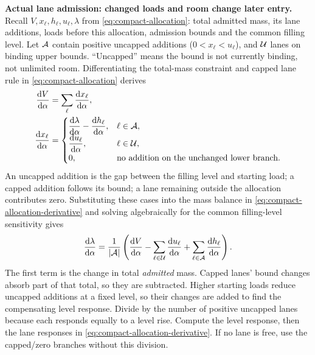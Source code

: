 \documentclass[10pt,a4paper]{article}
\begin{document}
\textbf{Actual lane admission: changed loads and room change later entry.}
Recall $V,x_\ell,h_\ell,u_\ell,\lambda$ from
\eqref{eq:compact-allocation}: total admitted mass, its lane additions,
loads before this allocation, admission bounds and the common filling
level. Let ${\cal A}$ contain positive uncapped additions
($0<x_\ell<u_\ell$), and ${\cal U}$ lanes on binding upper bounds.
``Uncapped'' means the bound is not currently binding, not unlimited room.
Differentiating the total-mass constraint and capped lane rule in \eqref{eq:compact-allocation} derives
\begin{equation}
 \begin{aligned}
 \frac{\mathrm dV}{\mathrm d\alpha}
 &=\sum_\ell\frac{\mathrm dx_\ell}{\mathrm d\alpha},\\
 \frac{\mathrm dx_\ell}{\mathrm d\alpha}
 &=\begin{cases}
 \displaystyle\frac{\mathrm d\lambda}{\mathrm d\alpha}
             -\frac{\mathrm dh_\ell}{\mathrm d\alpha},&\ell\in{\cal A},\\
 \displaystyle\frac{\mathrm du_\ell}{\mathrm d\alpha},&\ell\in{\cal U},\\
 0,&\text{no addition on the unchanged lower branch}.
 \end{cases}
 \end{aligned}
 \label{eq:compact-allocation-derivative}
\end{equation}
An uncapped addition is the gap between the filling level and starting
load; a capped addition follows its bound; a lane remaining outside the
allocation contributes zero. Substituting these cases into the mass
balance in \eqref{eq:compact-allocation-derivative} and solving algebraically for the common filling-level sensitivity gives
\begin{equation}
 \frac{\mathrm d\lambda}{\mathrm d\alpha}
 =\frac1{|{\cal A}|}\left(
 \frac{\mathrm dV}{\mathrm d\alpha}
 -\sum_{\ell\in{\cal U}}\frac{\mathrm du_\ell}{\mathrm d\alpha}
 +\sum_{\ell\in{\cal A}}\frac{\mathrm dh_\ell}{\mathrm d\alpha}\right).
 \label{eq:compact-allocation-level-derivative}
\end{equation}
The first term is the change in total \emph{admitted} mass. Capped lanes'
bound changes absorb part of that total, so they are subtracted.
Higher starting loads reduce uncapped additions at a fixed level, so
their changes are added to find the compensating level response.
Divide by the number of positive uncapped lanes because each responds
equally to a level rise. Compute the level response, then the lane
responses in \eqref{eq:compact-allocation-derivative}.
If no lane is free, use the capped/zero branches without this division.
\end{document}
